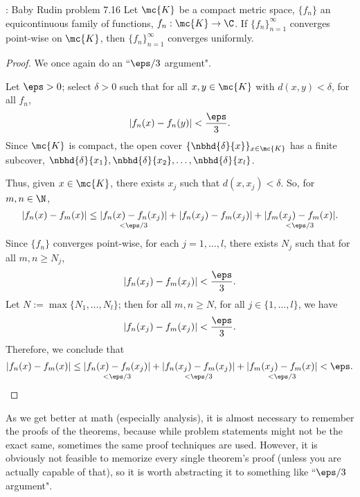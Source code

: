 \begin{ntheorem}{: Baby Rudin problem 7.16}
	Let \(\mc{K}\) be a compact metric space, \(\{f_n\}\) an equicontinuous family of functions, \(f_n:\mc{K}\to\C\). If \(\{f_n\}_{n=1}^{\infty}\) converges point-wise on \(\mc{K}\), then \(\{f_n\}_{n=1}^{\infty}\) converges uniformly.
\end{ntheorem}
\begin{proof}
	We once again do an ``\(\eps/3\) argument".
	
	\medskip
	
	Let \(\eps>0\); select \(\delta>0\) such that for all \(x,y\in\mc{K}\) with \(d(x,y)<\delta\), for all \(f_n\),
	\begin{equation*}
		|f_n(x)-f_n(y)|<\frac{\eps}{3}.
	\end{equation*}
	Since \(\mc{K}\) is compact, the open cover \(\{\nbhd{\delta}{x}\}_{x\in\mc{K}}\) has a finite subcover, \(\nbhd{\delta}{x_1},\nbhd{\delta}{x_2},\dots,\nbhd{\delta}{x_l}\).
	
	\medskip
	
	Thus, given \(x\in\mc{K}\), there exists \(x_j\) such that \(d(x,x_j)<\delta\). So, for \(m,n\in\N\),
	\begin{equation*}
		|f_n(x)-f_m(x)|\leq \underset{<\eps/3}{|f_n(x)-f_n(x_j)|}+|f_n(x_j)-f_m(x_j)|+\underset{<\eps/3}{|f_m(x_j)-f_m(x)|}.
	\end{equation*}
	Since \(\{f_n\}\) converges point-wise, for each \(j=1,\dots,l\), there exists \(N_j\) such that for all \(m,n\geq N_j\),
	\begin{equation*}
		|f_n(x_j)-f_m(x_j)|<\frac{\eps}{3}.
	\end{equation*}
	Let \(N:=\max\{N_1,\dots,N_l\}\); then for all \(m,n\geq N\), for all \(j\in\{1,\dots,l\}\), we have 
	\begin{equation*}
		|f_n(x_j)-f_m(x_j)|<\frac{\eps}{3}.
	\end{equation*}
	Therefore, we conclude that 
	\begin{equation*}
		|f_n(x)-f_m(x)|\leq \underset{<\eps/3}{|f_n(x)-f_n(x_j)|}+\underset{<\eps/3}{|f_n(x_j)-f_m(x_j)|}+\underset{<\eps/3}{|f_m(x_j)-f_m(x)|}<\eps.
	\end{equation*}
\end{proof}
\begin{note}
	As we get better at math (especially analysis), it is almost necessary to remember the proofs of the theorems, because while problem statements might not be the exact same, sometimes the same proof techniques are used. However, it is obviously not feasible to memorize every single theorem's proof (unless you are actually capable of that), so it is worth abstracting it to something like ``\(\eps/3\) argument".
\end{note}